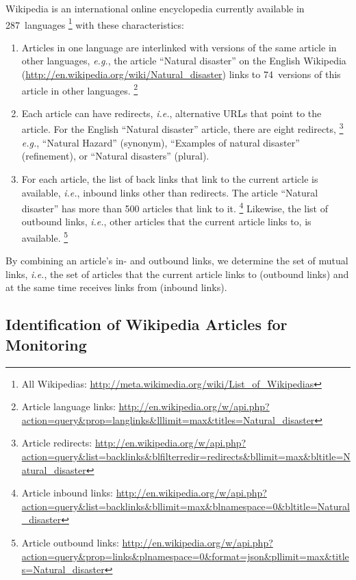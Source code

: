 \documentclass[letterpaper]{article}
\begin{document}
Wikipedia is an international online encyclopedia
currently available in 287~languages%
\footnote{All Wikipedias: \url{http://meta.wikimedia.org/wiki/List_of_Wikipedias}}
with these characteristics:
\begin{enumerate}
  \item Articles in one language are interlinked with versions of the same article
  in other languages, \emph{e.g.}, the article ``Natural disaster''
  on the English Wikipedia
  (\url{http://en.wikipedia.org/wiki/Natural_disaster})
  links to 74~versions of this article in other languages.%
  \footnote{Article language links:
  \url{http://en.wikipedia.org/w/api.php?action=query&prop=langlinks&lllimit=max&titles=Natural_disaster}}
  \item Each article can have redirects, \emph{i.e.}, alternative URLs
  that point to the article.
  For the English ``Natural disaster'' article, there are eight redirects,%
  \footnote{Article redirects:
  \url{http://en.wikipedia.org/w/api.php?action=query&list=backlinks&blfilterredir=redirects&bllimit=max&bltitle=Natural_disaster}}
  \emph{e.g.}, ``Natural Hazard'' (synonym),
  ``Examples of natural disaster'' (refinement), or
  ``Natural disasters'' (plural).
  \item For each article, the list of back links
  that link to the current article is available, \emph{i.e.},
  inbound links other than redirects.
  The article ``Natural disaster'' has more than 500 articles that link to it.%
  \footnote{Article inbound links: \url{http://en.wikipedia.org/w/api.php?action=query&list=backlinks&bllimit=max&blnamespace=0&bltitle=Natural_disaster}}
  Likewise, the list of outbound links, \emph{i.e.}, other articles
  that the current article links to, is available.%
  \footnote{Article outbound links: \url{http://en.wikipedia.org/w/api.php?action=query&prop=links&plnamespace=0&format=json&pllimit=max&titles=Natural_disaster}}
\end{enumerate}
By combining an article's in- and outbound links,
we determine the set of mutual links,
\emph{i.e.}, the set of articles that the current article links to (outbound links)
and at the same time receives links from (inbound links).

\subsection{Identification of Wikipedia Articles for Monitoring}
\label{sec:identification-of-monitoring}
\end{document}
